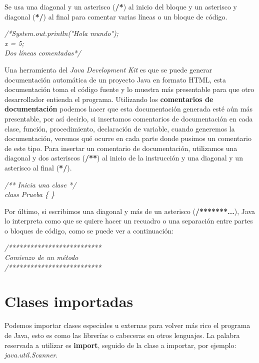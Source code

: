Se usa una diagonal y un asterisco (\textbf{/*}) al inicio del bloque y un asterisco y diagonal (\textbf{*/}) al final para comentar varias líneas o un bloque de código.
\begin{center}
	\textit{
		/*System.out.println("Hola mundo"); \\
		x = 5; \\
		Dos líneas comentadas*/
	}
\end{center}

Una herramienta del \textit{Java Development Kit} es que se puede generar documentación automática de un proyecto Java en formato HTML, esta documentación toma el código fuente y lo muestra más presentable para que otro desarrollador entienda el programa. Utilizando los \textbf{comentarios de documentación} podemos hacer que esta documentación generada esté aún más presentable, por así decirlo, si insertamos comentarios de documentación en cada clase, función, procedimiento, declaración de variable, cuando generemos la documentación, veremos qué ocurre en cada parte donde pusimos un comentario de este tipo. Para insertar un comentario de documentación, utilizamos una diagonal y dos asteriscos (\textbf{/**}) al inicio de la instrucción y una diagonal y un asterisco al final (\textbf{*/}).
\begin{center}
	\textit{
		/** Inicia una clase */ \\
		class Prueba \{ \}
	}
\end{center}

Por último, si escribimos una diagonal y más de un asterisco (\textbf{/*******...}), Java lo interpreta como que se quiere hacer un recuadro o una separación entre partes o bloques de código, como se puede ver a continuación:
\begin{center}
	\textit{
		/************************** \\
		Comienzo de un método \\
		/**************************
	}
\end{center}



\section{Clases importadas}
\hspace{0.55cm}Podemos importar clases especiales u externas para volver más rico el programa de Java, esto es como las librerías o cabeceras en otros lenguajes.
La palabra reservada a utilizar es \textbf{import}, seguido de la clase a importar, por ejemplo: \textit{java.util.Scanner}.



